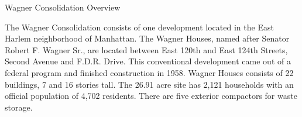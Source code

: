 Wagner Consolidation Overview

The Wagner Consolidation consists of one development located in the East Harlem neighborhood of Manhattan. The Wagner Houses, named after Senator Robert F. Wagner Sr., are located between East 120th and East 124th Streets, Second Avenue and F.D.R. Drive. This conventional development came out of a federal program and finished construction in 1958. Wagner Houses consists of  22 buildings, 7 and 16 stories tall. The 26.91 acre site has 2,121 households with an official population of 4,702 residents. There are five exterior compactors for waste storage. 
